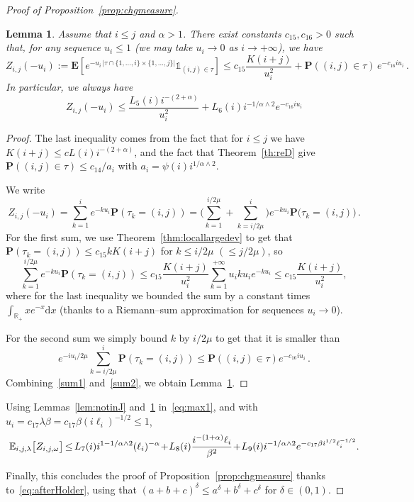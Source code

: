 \documentclass[10pt]{amsart}
\newtheorem{lemm}[theo]{Lemma}\newtheorem{prop}[theo]{Proposition}\newtheorem{coro}[theo]{Corollary}\newtheorem{conj}[theo]{Conjecture}
\theoremstyle{definition}\newtheorem{defi}[theo]{Definition}\newtheorem{rema}[theo]{Remark}\newtheorem{exam}[theo]{Example}\newtheorem{exem}[theo]{Example}\newtheorem{nota}[theo]{Notation}
\newcommand{\ga}{\alpha}
\newcommand{\gb}{\beta}
\newcommand{\gd}{\delta}
\newcommand{\gl}{\lambda}
\newcommand{\unbf}%
{\mathds{1}}
\newcommand{\dd}{\mathrm{d}}
\newcommand{\bP}{\ensuremath{\mathbf{P}}}
\newcommand{\bE}{\ensuremath{\mathbf{E}}}
\newcommand{\bbE}{\ensuremath{\mathbb{E}}}
\newcommand{\bbR}{\ensuremath{\mathbb{R}}}
\newcommand*{\Mk}{\mkern -2mu}
\begin{document}
\begin{proof}[Proof of Proposition~\ref{prop:chgmeasure}]
\begin{lemm}\label{lem:homogen}
Assume that $i\leq j$ and $\ga>1$. There exist constants $c_{15},c_{16}>0$ such that, for any sequence $u_i \leq 1$ (we may take $u_i\to 0$ as $i\to+\infty$), we have
\[
Z_{i,j}(-u_i) := \bE\left[e^{- u_i\,\vert \tau \cap \lbrace 1,\dots,i \rbrace \times \lbrace 1,\dots,j \rbrace \vert } \unbf_{(i,j)\in\tau} \right]
\leq c_{15}\frac{K(i+j)}{u_i^2} + \bP((i,j)\in\tau)\,e^{ - c_{16} i u_i }\,.
\]
In particular, we always have
\[
Z_{i,j}(-u_i) \leq \frac{L_{5}(i) i^{-(2+\ga)}}{u_i^2} + L_{6} (i) i^{-1/\ga\wedge 2} e^{- c_{16} i u_i}
\]
\end{lemm}

\begin{proof}
The last inequality comes from the fact that for $i\leq j$ we have\linebreak $K(i+j) \leq c L(i) i^{-(2+\ga)}$, and the fact that Theorem~\ref{th:reD} give $\bP((i,j)\in\tau) \leq c_{14} /a_i$ with $a_i = \psi(i) i^{1/\ga\wedge 2}$.

We write
\[
Z_{i,j}(-u_{i}) = \sum_{k=1}^i e^{- k u_i} \bP(\tau_k = (i,j)) = \bigg(\sum_{k=1}^{i/2\mu} + \sum_{k=i/2\mu}^i \bigg) e^{- k u_i} \bP \big(\tau_k = (i,j) \big)\,.
\]
For the first sum, we use Theorem~\ref{thm:locallargedev} to get that $\bP(\tau_k = (i,j)) \leq c_{15} k K(i+j)$ for $k\leq i/2\mu$ $(\leq j/2\mu)$, so
\begin{equation}\label{sum1}
\sum_{k=1}^{i/2\mu} e^{- k u_i} \bP(\tau_k = (i,j)) \leq c_{15} \frac{K(i+j)}{u_i^2} \sum_{k=1}^{+\infty} u_i ku_i e^{-k u_i} \leq c_{15} \frac{K(i+j)}{u_i^2},
\end{equation}
where for the last inequality we bounded the sum by a constant times $\int_{\bbR_+} x e^{-x} \dd x$ (thanks to a Riemann--sum approximation for sequences $u_i\to 0$).

For the second sum we simply bound $k$ by $i/2\mu$ to get that it is smaller than
\begin{equation}\label{sum2}
e^{- i u_i /2\mu } \sum_{k=i/2\mu}^i \bP(\tau_k = (i,j)) \le \bP((i,j) \in\tau) e^{- c_{16} i u_i}\,.
\end{equation}
Combining~\eqref{sum1} and~\eqref{sum2}, we obtain Lemma~\ref{lem:homogen}.
\end{proof}

Using Lemmas~\ref{lem:notinJ} and~\ref{lem:homogen} in~\eqref{eq:max1}, and with $u_i= c_{17} \gl\gb = c_{17}\gb (i \ell_i)^{-1/2}\leq 1$,
\begin{equation}
\!\bbE_{i,j,\lambda} \big[Z_{i,j,\omega} \big] \Mk\leq\Mk L_{7}(i) i^{1-1/\ga\wedge 2} (\ell_i)^{-\ga}
\!+\! L_{8}(i) \frac{i^{-(1+\ga)} \ell_i}{\gb^2} \!+\! L_{9}(i) i^{-1/\ga\wedge 2} e^{- c_{17} \gb i^{1/2} \ell_i^{-1/2} }.\!
\end{equation}

Finally, this concludes the proof of Proposition~\ref{prop:chgmeasure} thanks to~\eqref{eq:afterHolder}, using that $(a+b+c)^{\gd} \leq a^\gd + b^{\gd} + c^{\gd}$ for $\gd\in(0,1)$.
\end{proof}
\end{document}
